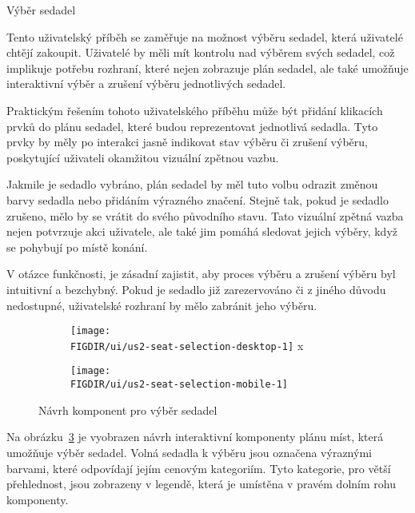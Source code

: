 \begin{subsection}{Výběr sedadel}
    \label{subsec:narvh-ui-transformace-uzivatelskych-pribehu-vyber-sedadel}
    \userstoryseatselection

    Tento uživatelský příběh se zaměřuje na možnost výběru sedadel, která uživatelé chtějí zakoupit.
    Uživatelé by měli mít kontrolu nad výběrem svých sedadel, což implikuje potřebu rozhraní, které nejen zobrazuje plán sedadel, ale také umožňuje interaktivní výběr a zrušení výběru jednotlivých sedadel.

    Praktickým řešením tohoto uživatelského příběhu může být přidání klikacích prvků do plánu sedadel, které budou reprezentovat jednotlivá sedadla.
    Tyto prvky by měly po interakci jasně indikovat stav výběru či zrušení výběru, poskytující uživateli okamžitou vizuální zpětnou vazbu.

    Jakmile je sedadlo vybráno, plán sedadel by měl tuto volbu odrazit změnou barvy sedadla nebo přidáním výrazného značení.
    Stejně tak, pokud je sedadlo zrušeno, mělo by se vrátit do svého původního stavu.
    Tato vizuální zpětná vazba nejen potvrzuje akci uživatele, ale také jim pomáhá sledovat jejich výběry, když se pohybují po místě konání.

    V otázce funkčnosti, je zásadní zajistit, aby proces výběru a zrušení výběru byl intuitivní a bezchybný.
    Pokud je sedadlo již zarezervováno či z jiného důvodu nedostupné, uživatelské rozhraní by mělo zabránit jeho výběru.

    \begin{figure}[H]
        \centering
        \begin{subfigure}{0.775\textwidth}
            \texttt{[image: \\FIGDIR/ui/us2-seat-selection-desktop-1]}
            \label{fig:us2-seat-selection-desktop-1}x
        \end{subfigure}
        \begin{subfigure}{0.2\textwidth}
            \texttt{[image: \\FIGDIR/ui/us2-seat-selection-mobile-1]}
            \label{fig:us2-seat-selection-mobile-1}
        \end{subfigure}
        \caption{Návrh komponent pro výběr sedadel}
        \label{fig:us2-seat-selection}
    \end{figure}

    Na obrázku~\ref{fig:us2-seat-selection} je vyobrazen návrh interaktivní komponenty plánu míst, která umožňuje výběr sedadel.
    Volná sedadla k výběru jsou označena výraznými barvami, které odpovídají jejím cenovým kategoriím.
    Tyto kategorie, pro větší přehlednost, jsou zobrazeny v legendě, která je umístěna v pravém dolním rohu komponenty.


\end{subsection}
